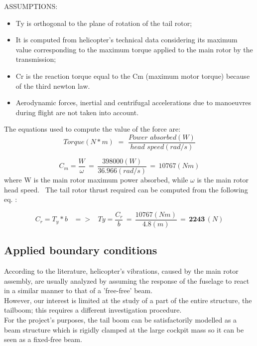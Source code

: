 \noindent
ASSUMPTIONS: 
\begin{itemize}
	\item Ty is orthogonal to the plane of rotation of the tail rotor;
	\item It is computed from helicopter's technical data considering its maximum value corresponding to the maximum torque applied to the main rotor by the transmission;
	\item Cr is the reaction torque equal to the Cm (maximum motor torque) because of the third newton law. 
	\item Aerodynamic forces, inertial and centrifugal accelerations due to manoeuvres during flight are not taken into account.
\end{itemize}

\noindent
The equations used to compute the value of the force are:
\begin{equation*}
Torque (N*m) \, \, = \, \, \frac{Power \, \, absorbed(W)}{head \, \, speed(rad/s)}  
\end{equation*}

\begin{equation*}
C_m  = \frac{W}{\omega} \, = \, \frac{398000 (W)}{36.966 (rad/s)} \, = \, 10767 (Nm)
\end{equation*}
where W is the main rotor maximum power absorbed, while $\omega$ is the main rotor head speed. \
The tail rotor thrust required can be computed from the following eq. :

\begin{equation*}
C_r = T_y * b \, \, \, \, \, => \, \, \, \, \,  Ty = \frac{C_r}{b} \, = \, \frac{10767(Nm)}{4.8 (m)}  \, = \, \textbf{2243} \, (N)
\end{equation*}



\clearpage
\subsection*{Applied boundary conditions}
\noindent
According to the literature, helicopter's vibrations, caused by the main rotor assembly, are usually analyzed by assuming the response of the fuselage to react in a similar manner to that of a 'free-free' beam. \\
However, our interest is limited at the study of a part of the entire structure, the tailboom; this requires a different investigation procedure. \\ 
For the project's purposes, the tail boom can be satisfactorily modelled as a beam structure which is rigidly clamped at the large cockpit mass so it can be seen as a fixed-free beam. \\





